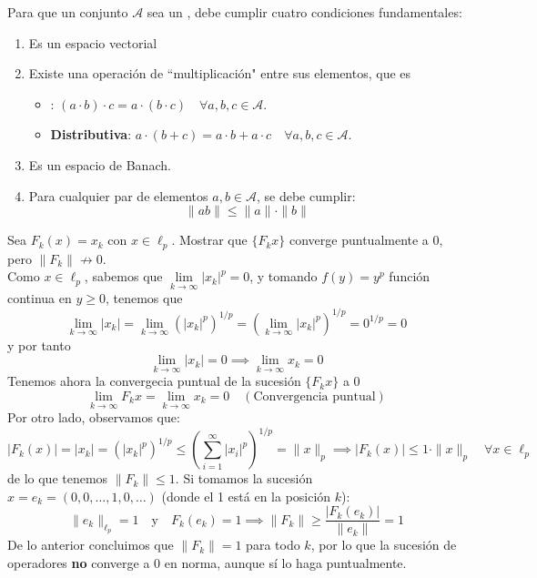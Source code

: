 \begin{definicion}
    Para que un conjunto $\mathcal{A}$ sea un , debe cumplir cuatro condiciones fundamentales:
    \begin{enumerate}
        \item Es un espacio vectorial
        \item Existe una operación de ``multiplicación" entre sus elementos, que es 
        \begin{itemize}
            \item {}: $(a \cdot b) \cdot c = a \cdot (b \cdot c)\quad \forall a, b, c \in \mathcal{A}$.
            \item \textbf{Distributiva}: $a \cdot (b + c) = a \cdot b + a \cdot c \quad \forall a, b, c \in \mathcal{A}$.
        \end{itemize}
        \item Es un espacio de Banach.
        \item Para cualquier par de elementos $a, b \in \mathcal{A}$, se debe cumplir:$$\|ab\| \leq \|a\| \cdot \|b\|$$
    \end{enumerate}
\end{definicion}

\begin{ejercicio}
    Sea $F_k(x) = x_k$ con $x \in \ell_p$. Mostrar que $\{F_k x\}$ converge puntualmente a $0$, pero $\|F_k\| \not\to 0$. \\
    \noindent
    Como $x \in \ell_p$, sabemos que $\lim\limits_{k \to \infty} |x_k|^p = 0$, y tomando $f(y)= y^p$ función continua en $y\geq 0$, tenemos que 
    $$\lim_{k \to \infty} |x_k| = \lim_{k \to \infty} \left( |x_k|^p \right)^{1/p} = \left( \lim_{k \to \infty} |x_k|^p \right)^{1/p} = 0^{1/p} = 0$$
    y por tanto 
    $$\lim_{k \to \infty} |x_k| = 0 \implies \lim_{k \to \infty} x_k = 0$$
    Tenemos ahora la convergecia puntual de la sucesión $\{F_k x\}$ a $0$
    \begin{equation*}
        \lim_{k \to \infty} F_k x = \lim_{k \to \infty} x_k = 0 \quad (\text{Convergencia puntual})
    \end{equation*}
    Por otro lado, observamos que:
    \begin{equation*}
        |F_k(x)| = |x_k|= (|x_k|^p)^{1/p}\le \left( \sum_{i=1}^{\infty} |x_i|^p \right)^{1/p} = \|x\|_{p} \implies |F_k(x)| \le 1 \cdot \|x\|_{p} \quad \forall x \in \ell_p   
    \end{equation*}
    de lo que tenemos $\|F_k\| \le 1$. Si tomamos la sucesión $x = e_k = (0, 0, \dots, 1, 0, \dots)$ (donde el 1 está en la posición $k$):
    \[
    \|e_k\|_{\ell_p} = 1 \quad \text{y} \quad F_k(e_k) = 1 \implies \|F_k\| \ge \frac{|F_k(e_k)|}{\|e_k\|} = 1
    \]
    De lo anterior concluimos que $\|F_k\| = 1$ para todo $k$, por lo que la sucesión de operadores \textbf{no} converge a 0 en norma, aunque sí lo haga puntualmente.
\end{ejercicio}

